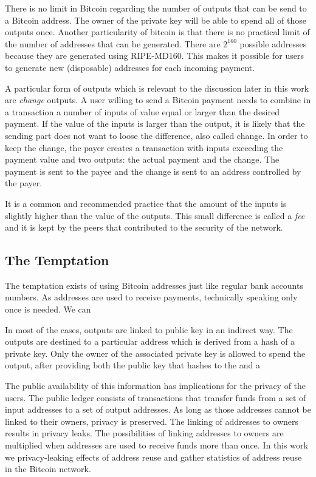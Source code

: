 \documentclass[journal]{IEEEtran}
\begin{document}
There is no limit in Bitcoin regarding the number of outputs that can be send to a Bitcoin address.
The owner of the private key will be able to spend all of those outputs once.
Another particularity of bitcoin is that there is no practical limit of the number of addresses that can be generated.
There are $2^{160}$ possible addresses because they are generated using RIPE-MD160.
This makes it possible for users to generate new (disposable) addresses for each incoming payment.

A particular form of outputs which is relevant to the discussion later in this work are \emph{change} outputs.
A user willing to send a Bitcoin payment needs to combine in a transaction a number of inputs of value equal or larger than the desired payment.
If the value of the inputs is larger than the output, it is likely that the sending part does not want to loose the difference, also called change.
In order to keep the change, the payer creates a transaction with inputs exceeding the payment value and two outputs: the actual payment and the change.
The payment is sent to the payee and the change is sent to an address controlled by the payer.

It is a common and recommended practice that the amount of the inputs is slightly higher than the value of the outputs.
This small difference is called a \emph{fee} and it is kept by the peers that contributed to the security of the network.



\subsection{The Temptation}

The temptation exists of using Bitcoin addresses just like regular bank accounts numbers.
As addresses are used to receive payments, technically speaking only once is needed.
We can 


In most of the cases, outputs are linked to public key in an indirect way.
The outputs are destined to a particular address which is derived from a hash of a private key.
Only the owner of the associated private key is allowed to spend the output, after providing both the public key that hashes to the  and a


The public availability of this information has implications for the privacy of the users.
The public ledger consists of transactions that transfer funds from a set of input addresses to a set of output addresses.
As long as those addresses cannot be linked to their owners, privacy is preserved.
The linking of addresses to owners results in privacy leaks.
The possibilities of linking addresses to owners are multiplied when addresses are used to receive funds more than once.
In this work we privacy-leaking effects of address reuse and gather statistics of address reuse in the Bitcoin network.
\end{document}
